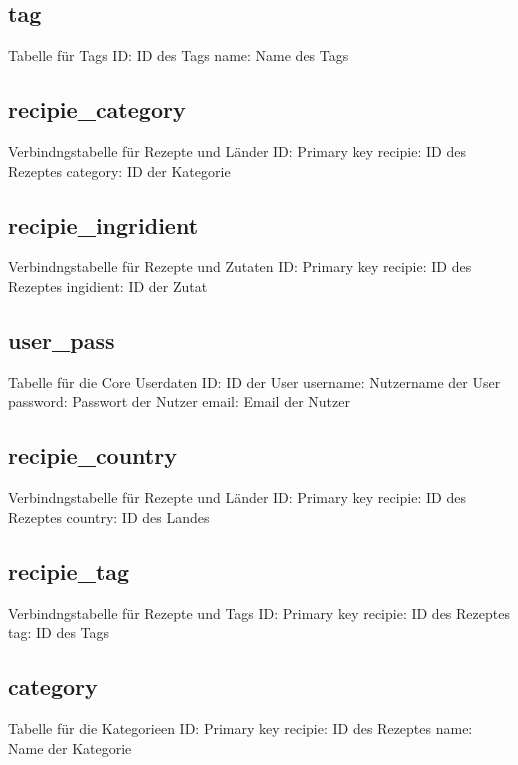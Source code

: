 \documentclass{article}
\begin{document}
\subsection{tag}
Tabelle für Tags
ID: ID des Tags
\newline
name: Name des Tags

\subsection{recipie\_category}
Verbindngstabelle für Rezepte und Länder
ID: Primary key
\newline
recipie: ID des Rezeptes
\newline
category: ID der Kategorie

\subsection{recipie\_ingridient}
Verbindngstabelle für Rezepte und Zutaten
ID: Primary key
\newline
recipie: ID des Rezeptes
\newline
ingidient: ID der Zutat

\subsection{user\_pass}
Tabelle für die Core Userdaten
ID: ID der User
\newline
username: Nutzername der User
\newline
password: Passwort der Nutzer
\newline
email: Email der Nutzer

\subsection{recipie\_country}
Verbindngstabelle für Rezepte und Länder
ID: Primary key
\newline
recipie: ID des Rezeptes
\newline
country: ID des Landes

\subsection{recipie\_tag}
Verbindngstabelle für Rezepte und Tags
ID: Primary key
\newline
recipie: ID des Rezeptes
\newline
tag: ID des Tags

\subsection{category}
Tabelle für die Kategorieen
ID: Primary key
\newline
recipie: ID des Rezeptes
\newline
name: Name der Kategorie
\end{document}

